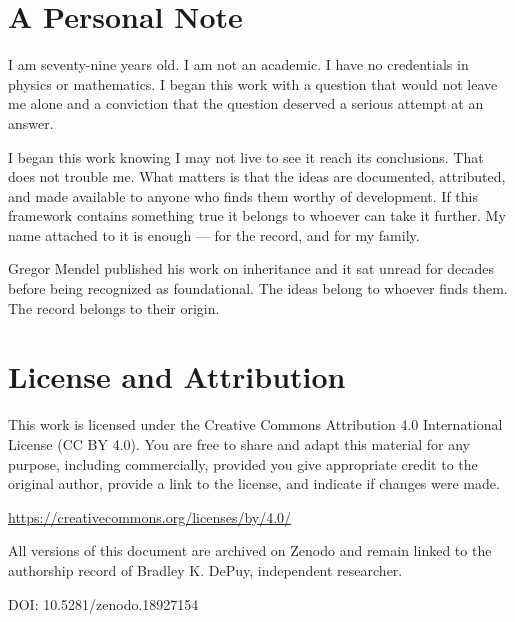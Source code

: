 \documentclass[11pt,letterpaper]{article}
\begin{document}
\section{A Personal Note}
\label{sec:orgc4f620b}

I am seventy-nine years old. I am not an academic. I have no credentials in physics or mathematics. I began this work with a question that would not leave me alone and a conviction that the question deserved a serious attempt at an answer.

I began this work knowing I may not live to see it reach its conclusions. That does not trouble me. What matters is that the ideas are documented, attributed, and made available to anyone who finds them worthy of development. If this framework contains something true it belongs to whoever can take it further. My name attached to it is enough --- for the record, and for my family.

Gregor Mendel published his work on inheritance and it sat unread for decades before being recognized as foundational. The ideas belong to whoever finds them. The record belongs to their origin.
\section{License and Attribution}
\label{sec:orgfa02dc5}

This work is licensed under the Creative Commons Attribution 4.0 International License (CC BY 4.0). You are free to share and adapt this material for any purpose, including commercially, provided you give appropriate credit to the original author, provide a link to the license, and indicate if changes were made.

\url{https://creativecommons.org/licenses/by/4.0/}

All versions of this document are archived on Zenodo and remain linked to the authorship record of Bradley K. DePuy, independent researcher.

DOI: 10.5281/zenodo.18927154
\end{document}
